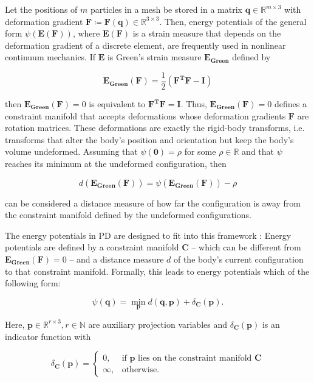 Let the positions of $m$ particles in a mesh be stored in a matrix $\bm{q} \in \mathbb{R}^{m \times 3}$ with deformation gradient $\bm{F} 
\coloneqq \bm{F(\bm{q})} \in \mathbb{R}^{3 \times 3}$. Then, energy potentials of the general form $\psi(\bm{E}(\bm{F}))$, where 
$\bm{E}(\bm{F})$ is a strain measure that depends on the deformation gradient of a discrete element, are frequently used in nonlinear 
continuum mechanics. If $\bm{E}$ is Green's strain measure $\bm{E_{\text{Green}}}$ defined by 

\[
\bm{E_{\text{Green}}}(\bm{F}) = \frac{1}{2}(\bm{F^TF} - \bm{I})
\]

\noindent then $\bm{E_{\text{Green}}}(\bm{F}) = 0$ is equivalent to $\bm{F^TF} = \bm{I}$. Thus, $\bm{E_{\text{Green}}}(\bm{F}) = 0$ defines a constraint
manifold that accepts deformations whose deformation gradients $\bm{F}$ are rotation matrices. These deformations are exactly the rigid-body 
transforms, i.e. transforms that alter the body's position and orientation but keep the body's volume undeformed. Assuming that $\psi(\bm{0}) 
= \rho$ for some $\rho \in \mathbb{R}$ and that $\psi$ reaches its minimum at the undeformed configuration, then 

\[
    d(\bm{E_{\text{Green}}}(\bm{F})) = \psi(\bm{E_{\text{Green}}}(\bm{F})) - \rho
\]

\noindent can be considered a distance measure of how far the configuration is away from the constraint manifold defined by the undeformed 
configurations. 

The energy potentials in PD are designed to fit into this framework \cite{bouaziz2014}: Energy potentials are defined by a constraint 
manifold $\bm{C}$ -- which 
can be different from $\bm{E_{\text{Green}}(\bm{F})} = 0$ -- and a distance measure $d$ of the body's current configuration to that constraint 
manifold. Formally, this leads to energy potentials which of the 
following form:

\[
    \psi({\bm{q}}) = \min_{\bm{p}} d(\bm{q}, \bm{p}) + \delta_{\bm{C}}(\bm{p}).
\]

\noindent Here, $\bm{p} \in \mathbb{R}^{r \times 3}, r \in \mathbb{N}$ are auxiliary projection variables and $\delta_{\bm{C}}(\bm{p})$ is an indicator function with 

\[
    \delta_{\bm{C}}(\bm{p})= 
\begin{cases}
0,& \text{if } \bm{p} \text{ lies on the constraint manifold } \bm{C}\\
\infty,& \text{otherwise.}
\end{cases}
\]

